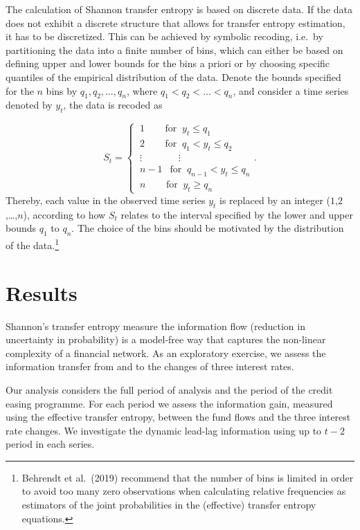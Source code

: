 \documentclass[
]{article}
\begin{document}
The calculation of Shannon transfer entropy is based on discrete data.
If the data does not exhibit a discrete structure that allows for
transfer entropy estimation, it has to be discretized. This can be
achieved by symbolic recoding, i.e.~by partitioning the data into a
finite number of bins, which can either be based on defining upper and
lower bounds for the bins a priori or by choosing specific quantiles of
the empirical distribution of the data. Denote the bounds specified for
the \(n\) bins by \(q_1, q_2, ..., q_n\), where \(q_1< q_2< ... <q_n\),
and consider a time series denoted by \(y_t\), the data is recoded as

\[
S_t=
\begin{cases}
~1~~~~~~~~ \mbox{ for }~  y_t\leq q_1\\
~ 2~ ~~~~~~~\mbox{ for }~  q_1<y_t\leq q_2\\
~\vdots~~~~~~~~~~~~~~~~~\vdots\\
~n-1~~\mbox{ for }~  q_{n-1}<y_t \leq q_n\\
~n ~~~~~~~~\mbox{     for } ~ y_t\geq q_n
\end{cases}.
\] Thereby, each value in the observed time series \(y_t\) is replaced
by an integer (\(1\),\(2\),\ldots,\(n\)), according to how \(S_t\)
relates to the interval specified by the lower and upper bounds \(q_1\)
to \(q_n\). The choice of the bins should be motivated by the
distribution of the data.\footnote{Behrendt et al.~(2019) recommend that
  the number of bins is limited in order to avoid too many zero
  observations when calculating relative frequencies as estimators of
  the joint probabilities in the (effective) transfer entropy equations.}

\hypertarget{results}{%
\section{Results}\label{results}}

Shannon's transfer entropy measure the information flow (reduction in
uncertainty in probability) is a model-free way that captures the
non-linear complexity of a financial network. As an exploratory
exercise, we assess the information transfer from and to the changes of
three interest rates.

Our analysis considers the full period of analysis and the period of the
credit easing programme. For each period we assess the information gain,
measured using the effective transfer entropy, between the fund flows
and the three interest rate changes. We investigate the dynamic lead-lag
information using up to \(t-2\) period in each series.
\end{document}
